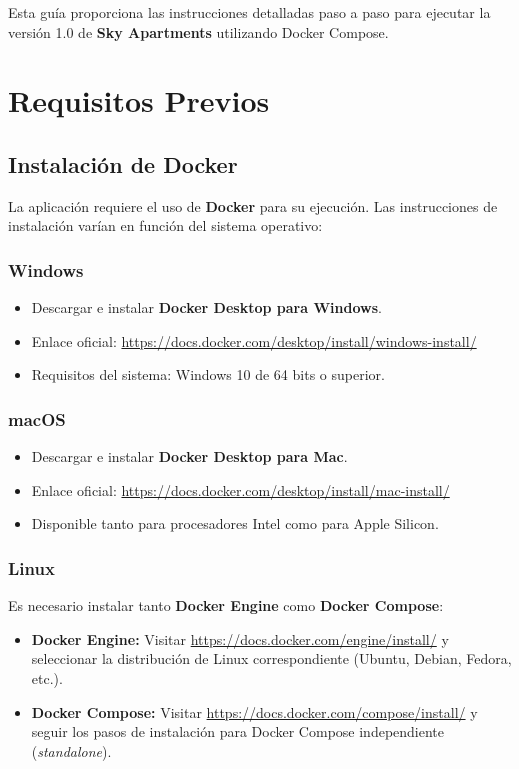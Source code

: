 Esta guía proporciona las instrucciones detalladas paso a paso para ejecutar la versión 1.0 de \textbf{Sky Apartments} utilizando Docker Compose.

\section{Requisitos Previos}

\subsection{Instalación de Docker}
La aplicación requiere el uso de \textbf{Docker} para su ejecución. Las instrucciones de instalación varían en función del sistema operativo:

\subsubsection*{Windows}
\begin{itemize}
    \item Descargar e instalar \textbf{Docker Desktop para Windows}.
    \item Enlace oficial: \url{https://docs.docker.com/desktop/install/windows-install/}
    \item Requisitos del sistema: Windows 10 de 64 bits o superior.
\end{itemize}

\subsubsection*{macOS}
\begin{itemize}
    \item Descargar e instalar \textbf{Docker Desktop para Mac}.
    \item Enlace oficial: \url{https://docs.docker.com/desktop/install/mac-install/}
    \item Disponible tanto para procesadores Intel como para Apple Silicon.
\end{itemize}

\subsubsection*{Linux}
Es necesario instalar tanto \textbf{Docker Engine} como \textbf{Docker Compose}:

\begin{itemize}
    \item \textbf{Docker Engine:} Visitar \url{https://docs.docker.com/engine/install/} y seleccionar la distribución de Linux correspondiente (Ubuntu, Debian, Fedora, etc.).
    \item \textbf{Docker Compose:} Visitar \url{https://docs.docker.com/compose/install/} y seguir los pasos de instalación para Docker Compose independiente (\textit{standalone}).
\end{itemize}

